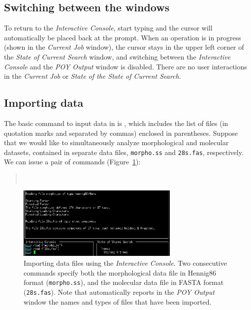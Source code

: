 {\subsection{Switching between the windows}
To return to the \emph{Interactive Console}, start typing and the cursor will automatically be placed back at the \poy prompt. When an operation is in progress (shown in the \emph{Current Job} window), the cursor stays in the upper left corner of the \emph{State of Current Search} window, and switching between the \emph{Interactive Console} and the \emph{POY Output} window is disabled. There are no user interactions in the \emph{Current Job} or \emph{State of the State of Current Search}.

\subsection{Importing data} \label{sec:import}

The basic command to input data in \poy is , which includes the list of files (in quotation marks and separated by commas) enclosed in parentheses. Suppose that we would like to simultaneously analyze morphological and molecular datasets, contained in separate data files, \texttt{morpho.ss} and \texttt{28s.fas}, respectively. We can issue a pair of  commands (Figure~\ref{fig:readingexample}):
\begin{quote}
        \\
\end{quote}

\begin{figure}
    \begin{center}
        \includegraphics[width=0.7\textwidth]{doc/figures/reading_example.jpg}
    \end{center}
    \caption{Importing data files using the \emph{Interactive Console}. Two consecutive  commands specify both the morphological data file in Hennig86 format (\texttt{morpho.ss}), and the molecular data file in FASTA format (\texttt{28s.fas}). Note that \poy automatically reports  in the \emph{POY Output} window the names and types of files that have been imported.}
    \label{fig:readingexample}
\end{figure}

}
